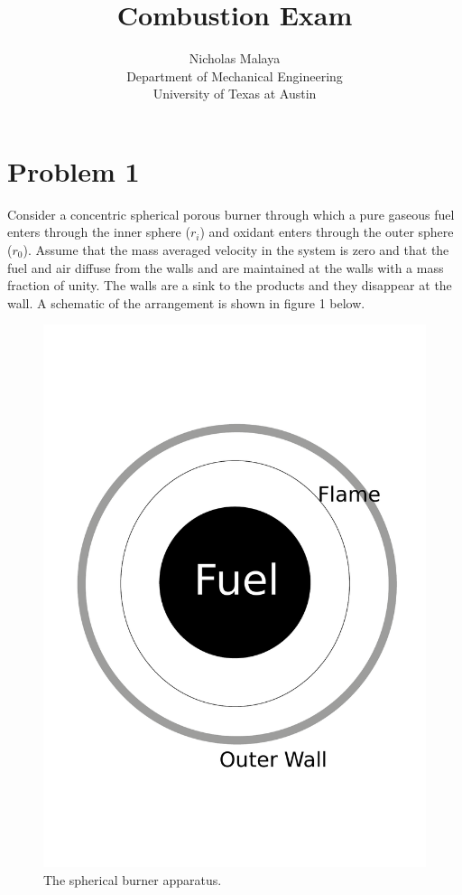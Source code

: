 \documentclass{article}
\title{\bf{Combustion Exam}}
\author{Nicholas Malaya\\ Department of Mechanical Engineering \\
University of Texas at Austin}
\date{}
\begin{document}
\maketitle

\newpage
\section*{Problem 1}
Consider a concentric spherical porous burner through which a pure
gaseous fuel enters through the inner sphere ($r_i$) and oxidant enters
through the outer sphere ($r_0$). Assume that the mass averaged velocity
in the system is zero and that the fuel and air diffuse from the walls
and are maintained at the walls with a mass fraction of unity. The walls
are a sink to the products and they disappear at the wall. A schematic
of the arrangement is shown in figure 1 below. 

\begin{figure}[h]
 \begin{center}
  \includegraphics[scale=.3]{figs/spherical_burner.pdf}
  \caption{The spherical burner apparatus.}
 \end{center}
\end{figure}
\end{document}
